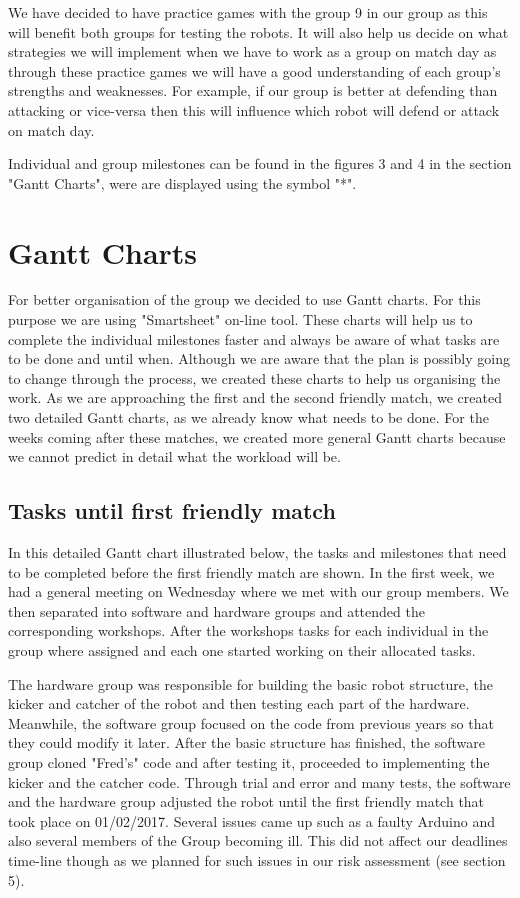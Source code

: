 \documentclass{article}
\begin{document}
We have decided to have practice games with the group 9 in our group as this
will benefit both groups for testing the robots. It will also help us decide on
what strategies we will implement when we have to work as a group on match day
as through these practice games we will have a good understanding of each
group's strengths and weaknesses. For example, if our group is better at
defending than attacking or vice-versa then this will influence which robot will
defend or attack on match day.

Individual and group milestones can be found in the figures 3 and 4 in the
section "Gantt Charts", were are displayed using the symbol "*".

\section{Gantt Charts}
For better organisation of the group we decided to use Gantt charts. For this
purpose we are using "Smartsheet" on-line tool. These charts will help us to
complete the individual milestones faster and always be aware of what tasks are
to be done and until when. Although we are aware that the plan is possibly going
to change through the process, we created these charts to help us organising the
work. As we are approaching the first and the second friendly match, we created
two detailed Gantt charts, as we already know what needs to be done. For the
weeks coming after these matches, we created more general Gantt charts because
we cannot predict in detail what the workload will be.


\subsection{Tasks until first friendly match}
In this detailed Gantt chart illustrated below, the tasks and milestones that
need to be completed before the first friendly match are shown. In the first
week, we had a general meeting on Wednesday where we met with our group members.
We then separated into software and hardware groups and attended the
corresponding workshops. After the workshops tasks for each individual in the
group where assigned and each one started working on their allocated tasks.


The hardware group was responsible for building the basic robot structure, the
kicker and catcher of the robot and then testing each part of the hardware.
Meanwhile, the software group focused on the code from previous years so that
they could modify it later. After the basic structure has finished, the software
group cloned "Fred's" code and after testing it, proceeded to implementing the
kicker and the catcher code. Through trial and error and many tests, the
software and the hardware group adjusted the robot until the first friendly
match that took place on 01/02/2017. Several issues came up such as a faulty
Arduino and also several members of the Group becoming ill. This did not affect
our deadlines time-line though as we planned for such issues in our risk
assessment (see section 5).
\end{document}
